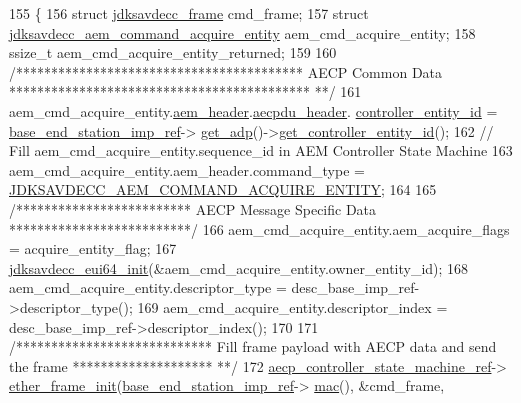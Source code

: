 \begin{DoxyCode}
155 \{
156     \textcolor{keyword}{struct }\hyperlink{structjdksavdecc__frame}{jdksavdecc\_frame} cmd\_frame;
157     \textcolor{keyword}{struct }\hyperlink{structjdksavdecc__aem__command__acquire__entity}{jdksavdecc\_aem\_command\_acquire\_entity} 
      aem\_cmd\_acquire\_entity;
158     ssize\_t aem\_cmd\_acquire\_entity\_returned;
159 
160     \textcolor{comment}{/***************************************** AECP Common Data *******************************************
      **/}
161     aem\_cmd\_acquire\_entity.\hyperlink{structjdksavdecc__aem__command__acquire__entity_ae1e77ccb75ff5021ad923221eab38294}{aem\_header}.\hyperlink{structjdksavdecc__aecpdu__aem_ae8460ae179666e7ce268ed1ef33d0de3}{aecpdu\_header}.
      \hyperlink{structjdksavdecc__aecpdu__common_affc928ddb4fc62d1d04a775d36e5f2c8}{controller\_entity\_id} = \hyperlink{classavdecc__lib_1_1descriptor__base__imp_a550c969411f5f3b69f55cc139763d224}{base\_end\_station\_imp\_ref}->
      \hyperlink{classavdecc__lib_1_1end__station__imp_a471a74540ce6182fad0c17dfd010107e}{get\_adp}()->\hyperlink{classavdecc__lib_1_1adp_a0c0959a46658c0a22e9530334b2912da}{get\_controller\_entity\_id}();
162     \textcolor{comment}{// Fill aem\_cmd\_acquire\_entity.sequence\_id in AEM Controller State Machine}
163     aem\_cmd\_acquire\_entity.aem\_header.command\_type = 
      \hyperlink{group__command_ga74ebee0a0531409bb10f7ce9e1216c04}{JDKSAVDECC\_AEM\_COMMAND\_ACQUIRE\_ENTITY};
164 
165     \textcolor{comment}{/************************* AECP Message Specific Data **************************/}
166     aem\_cmd\_acquire\_entity.aem\_acquire\_flags = acquire\_entity\_flag;
167     \hyperlink{group__eui64_ga6eda4ed21b6f0d526b180ac633eeba69}{jdksavdecc\_eui64\_init}(&aem\_cmd\_acquire\_entity.owner\_entity\_id);
168     aem\_cmd\_acquire\_entity.descriptor\_type = desc\_base\_imp\_ref->descriptor\_type();
169     aem\_cmd\_acquire\_entity.descriptor\_index = desc\_base\_imp\_ref->descriptor\_index();
170 
171     \textcolor{comment}{/**************************** Fill frame payload with AECP data and send the frame ********************
      **/}
172     \hyperlink{namespaceavdecc__lib_a0b1b5aea3c0490f77cbfd9178af5be22}{aecp\_controller\_state\_machine\_ref}->
      \hyperlink{classavdecc__lib_1_1aecp__controller__state__machine_a86ff947c5e6b799cfb877d3767bfa1f9}{ether\_frame\_init}(\hyperlink{classavdecc__lib_1_1descriptor__base__imp_a550c969411f5f3b69f55cc139763d224}{base\_end\_station\_imp\_ref}->
      \hyperlink{classavdecc__lib_1_1end__station__imp_a08e1bd1861b3b8f447ea374a65ac11f9}{mac}(), &cmd\_frame,

\end{DoxyCode}
